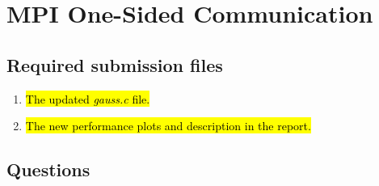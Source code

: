 \section{MPI One-Sided Communication}
\subsection{Required submission files}
\begin{enumerate}
  \item \hl{The updated \emph{gauss.c} file.}

  \item \hl{The new performance plots and description in the report.}

\end{enumerate}

\subsection{Questions}
